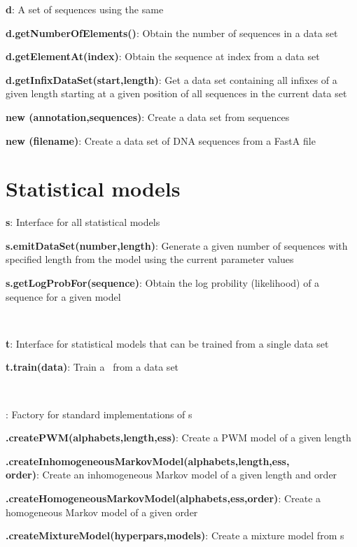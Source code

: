 \documentclass[10pt]{scrartcl}
\newcommand{\entry}[3]{{\bfseries #1#2}: #3}
\begin{document}
\begin{flushleft}
\entry{\DataSet}{ d}{A set of sequences using the same \AlphabetContainer}

\entry{d}{.getNumberOfElements()}{Obtain the number of sequences in a data set}

\entry{d}{.getElementAt(index)}{Obtain the sequence at index from a data set}

\entry{d}{.getInfixDataSet(start,length)}{Get a data set containing all infixes of a given length starting at a given position of all sequences in the current data set}

\entry{new \DataSet}{(annotation,sequences)}{Create a data set from sequences}

\entry{new \DNADataSet}{(filename)}{Create a data set of DNA sequences from a FastA file}

\section{Statistical models}

\entry{\StatMod}{ s}{Interface for all statistical models}

\entry{s}{.emitDataSet(number,length)}{Generate a given number of sequences with specified length from the model using the current parameter values}

\entry{s}{.getLogProbFor(sequence)}{Obtain the log probility (likelihood) of a sequence for a given model}

~

\entry{\TrainSM}{ t}{Interface for statistical models that can be trained from a single data set}

\entry{t}{.train(data)}{Train a \TrainSM~from a data set}

~

%
\entry{\TrainSMFactory}{}{Factory for standard implementations of \TrainSM s}

\entry{\TrainSMFactory}{.createPWM(alphabets,length,ess)}{Create a PWM model of a given length}

\entry{\TrainSMFactory}{.createInhomogeneousMarkovModel(alphabets,length,ess,\\order)}{Create an inhomogeneous Markov model of a given length and order}

\entry{\TrainSMFactory}{.createHomogeneousMarkovModel(alphabets,ess,order)}{Create a homogeneous Markov model of a given order}

\entry{\TrainSMFactory}{.createMixtureModel(hyperpars,models)}{Create a mixture model from \TrainSM s}


\end{flushleft}
\end{document}
